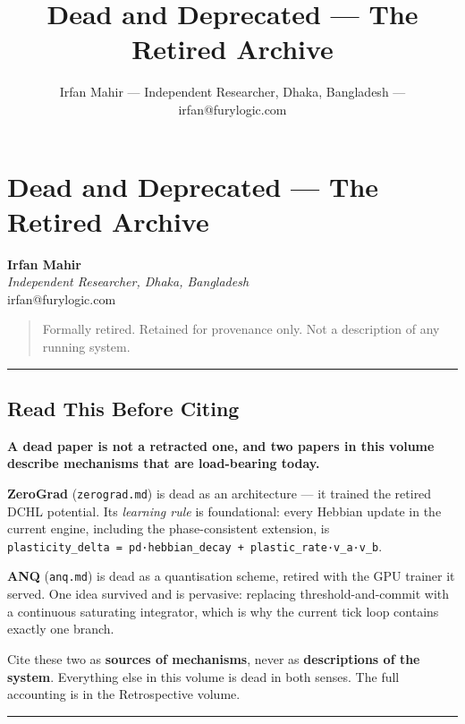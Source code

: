 \documentclass[
  11pt,
  a4paper,
]{article}
\title{Dead and Deprecated --- The Retired Archive}
\author{Irfan Mahir --- Independent Researcher, Dhaka, Bangladesh ---
irfan@furylogic.com}
\date{}
\begin{document}
\maketitle

{
\hypersetup{linkcolor=}
\setcounter{tocdepth}{2}
\tableofcontents
}
\section{Dead and Deprecated --- The Retired
Archive}\label{dead-and-deprecated-the-retired-archive}

\textbf{Irfan Mahir}\\
\emph{Independent Researcher, Dhaka, Bangladesh}\\
irfan@furylogic.com

\begin{quote}
Formally retired. Retained for provenance only. Not a description of any
running system.
\end{quote}

\begin{center}\rule{0.5\linewidth}{0.5pt}\end{center}

\subsection{Read This Before Citing}\label{read-this-before-citing}

\textbf{A dead paper is not a retracted one, and two papers in this
volume describe mechanisms that are load-bearing today.}

\textbf{ZeroGrad} (\texttt{zerograd.md}) is dead as an architecture ---
it trained the retired DCHL potential. Its \emph{learning rule} is
foundational: every Hebbian update in the current engine, including the
phase-consistent extension, is
\texttt{plasticity\_delta\ =\ pd·hebbian\_decay\ +\ plastic\_rate·v\_a·v\_b}.

\textbf{ANQ} (\texttt{anq.md}) is dead as a quantisation scheme, retired
with the GPU trainer it served. One idea survived and is pervasive:
replacing threshold-and-commit with a continuous saturating integrator,
which is why the current tick loop contains exactly one branch.

Cite these two as \textbf{sources of mechanisms}, never as
\textbf{descriptions of the system}. Everything else in this volume is
dead in both senses. The full accounting is in the Retrospective volume.

\begin{center}\rule{0.5\linewidth}{0.5pt}\end{center}
\end{document}
